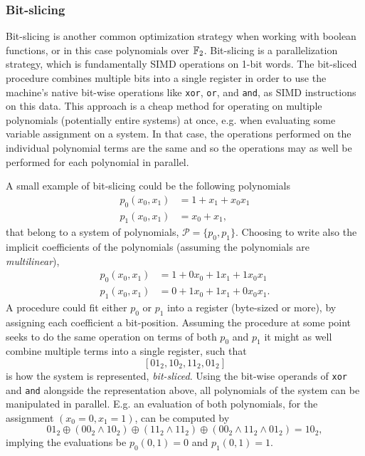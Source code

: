 \subsubsection{Bit-slicing}
Bit-slicing is another common optimization strategy when working with boolean functions, or in this case polynomials over $\mathbb{F}_2$. Bit-slicing is a parallelization strategy, which is fundamentally SIMD operations on 1-bit words. The bit-sliced procedure combines multiple bits into a single register in order to use the machine's native bit-wise operations like \texttt{xor}, \texttt{or}, and \texttt{and}, as SIMD instructions on this data. This approach is a cheap method for operating on multiple polynomials (potentially entire systems) at once, e.g. when evaluating some variable assignment on a system. In that case, the operations performed on the individual polynomial terms are the same and so the operations may as well be performed for each polynomial in parallel.

A small example of bit-slicing could be the following polynomials
\begin{equation*}
    \begin{split}
        p_0(x_0, x_1) &= 1 + x_1 + x_0x_1\\
        p_1(x_0, x_1) &= x_0 + x_1,
    \end{split}
\end{equation*} 
that belong to a system of polynomials, $\mathcal{P} = \{p_0, p_1\}$. Choosing to write also the implicit coefficients of the polynomials (assuming the polynomials are \textit{multilinear}),
\begin{equation*}
    \begin{split}
        p_0(x_0, x_1) &= 1 + 0x_0 + 1x_1 + 1x_0x_1\\
        p_1(x_0, x_1) &= 0 + 1x_0 + 1x_1 + 0x_0x_1.
    \end{split}
\end{equation*} 
A procedure could fit either $p_0$ or $p_1$ into a register (byte-sized or more), by assigning each coefficient a bit-position. Assuming the procedure at some point seeks to do the same operation on terms of both $p_0$ and $p_1$ it might as well combine multiple terms into a single register, such that 
$$
    [01_2, 10_2, 11_2, 01_2]
$$
is how the system is represented, \textit{bit-sliced}. Using the bit-wise operands of \texttt{xor} and \texttt{and} alongside the representation above, all polynomials of the system can be manipulated in parallel. E.g. an evaluation of both polynomials, for the assignment $(x_0 = 0, x_1 = 1)$, can be computed by
\begin{equation*}
                01_2 \oplus (00_2 \wedge 10_2) \oplus (11_2 \wedge 11_2) \oplus (00_2 \wedge 11_2 \wedge 01_2) = 10_2,
\end{equation*}
implying the evaluations be $p_0(0,1) = 0$ and $p_1(0,1) = 1$.

